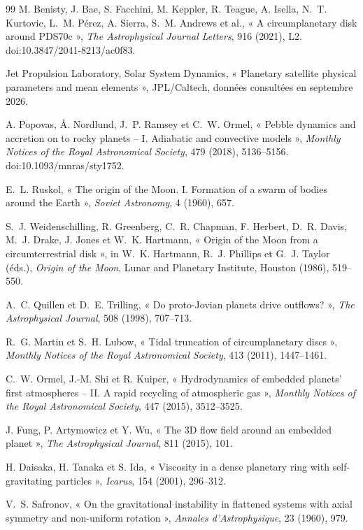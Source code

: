 \documentclass[11pt,a4paper,openany]{report}
\begin{document}
\begin{thebibliography}{99}
 M. Benisty, J. Bae, S. Facchini, M. Keppler, R. Teague, A. Isella,
N.~T. Kurtovic, L.~M. Pérez, A. Sierra, S.~M. Andrews et al., « A circumplanetary disk around
PDS70c », \emph{The Astrophysical Journal Letters}, 916 (2021), L2. doi:10.3847/2041-8213/ac0f83.

 Jet Propulsion Laboratory, Solar System Dynamics, « Planetary satellite physical
parameters and mean elements », JPL/Caltech, données consultées en septembre 2026.

 A. Popovas, Å. Nordlund, J.~P. Ramsey et C.~W. Ormel, « Pebble dynamics and
accretion on to rocky planets -- I. Adiabatic and convective models », \emph{Monthly Notices of the
Royal Astronomical Society}, 479 (2018), 5136--5156. doi:10.1093/mnras/sty1752.

 E.~L. Ruskol, « The origin of the Moon. I. Formation of a swarm of bodies
around the Earth », \emph{Soviet Astronomy}, 4 (1960), 657.

 S.~J. Weidenschilling, R. Greenberg, C.~R. Chapman, F. Herbert,
D.~R. Davis, M.~J. Drake, J. Jones et W.~K. Hartmann, « Origin of the Moon from a circumterrestrial
disk », in W.~K. Hartmann, R.~J. Phillips et G.~J. Taylor (éds.), \emph{Origin of the Moon}, Lunar
and Planetary Institute, Houston (1986), 519--550.

 A.~C. Quillen et D.~E. Trilling, « Do proto-Jovian planets drive
outflows? », \emph{The Astrophysical Journal}, 508 (1998), 707--713.

 R.~G. Martin et S.~H. Lubow, « Tidal truncation of circumplanetary
discs », \emph{Monthly Notices of the Royal Astronomical Society}, 413 (2011), 1447--1461.

 C.~W. Ormel, J.-M. Shi et R. Kuiper, « Hydrodynamics of embedded planets' first
atmospheres -- II. A rapid recycling of atmospheric gas », \emph{Monthly Notices of the Royal
Astronomical Society}, 447 (2015), 3512--3525.

 J. Fung, P. Artymowicz et Y. Wu, « The 3D flow field around an embedded
planet », \emph{The Astrophysical Journal}, 811 (2015), 101.

 H. Daisaka, H. Tanaka et S. Ida, « Viscosity in a dense planetary ring with
self-gravitating particles », \emph{Icarus}, 154 (2001), 296--312.

 V.~S. Safronov, « On the gravitational instability in flattened systems with
axial symmetry and non-uniform rotation », \emph{Annales d'Astrophysique}, 23 (1960), 979.


\end{thebibliography}
\end{document}
